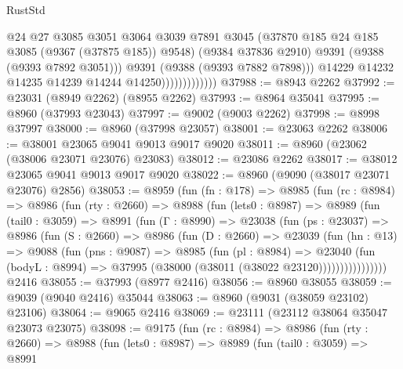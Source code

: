 \begin{lexlean}{RustStd}
\begin{coremodule}
                                  @24
                                  @27
                                  @3085
                                  @3051
                                  @3064
                                  @3039
                                  @7891
                                  @3045
                                  (@37870 @185 @24 @185 @3085 (@9367 (@37875 @185)) @9548)
                                  (@9384 @37836 @2910)
                                  @9391
                                  (@9388 (@9393 @7892 @3051)))
                                @9391
                                (@9388 (@9393 @7882 @7898)))
                              @14229
                              @14232
                              @14235
                              @14239
                              @14244
                              @14250)))))))))))))
@37988 := @8943 @2262
@37992 := @23031 (@8949 @2262) (@8955 @2262)
@37993 := @8964 @35041
@37995 := @8960 (@37993 @23043)
@37997 := @9002 (@9003 @2262)
@37998 := @8998 @37997
@38000 := @8960 (@37998 @23057)
@38001 := @23063 @2262
@38006 := @38001 @23065 @9041 @9013 @9017 @9020
@38011 := @8960 (@23062 (@38006 @23071 @23076) @23083)
@38012 := @23086 @2262
@38017 := @38012 @23065 @9041 @9013 @9017 @9020
@38022 := @8960 (@9090 (@38017 @23071 @23076) @2856)
@38053 := @8959
    (fun (fn : @178) =>
    @8985
      (fun (rc : @8984) =>
      @8986
        (fun (rty : @2660) =>
        @8988
          (fun (lets0 : @8987) =>
          @8989
            (fun (tail0 : @3059) =>
            @8991
              (fun (Γ : @8990) =>
              @23038
                (fun (ps : @23037) =>
                @8986
                  (fun (S : @2660) =>
                  @8986
                    (fun (D : @2660) =>
                    @23039
                      (fun (hn : @13) =>
                      @9088
                        (fun (pns : @9087) =>
                        @8985
                          (fun (pl : @8984) =>
                          @23040
                            (fun (bodyL : @8994) =>
                            @37995 (@38000 (@38011 (@38022 @23120))))))))))))))))
    @2416
@38055 := @37993 (@8977 @2416)
@38056 := @8960 @38055
@38059 := @9039 (@9040 @2416) @35044
@38063 := @8960 (@9031 (@38059 @23102) @23106)
@38064 := @9065 @2416
@38069 := @23111 (@23112 @38064 @35047 @23073 @23075)
@38098 := @9175
    (fun (rc : @8984) =>
    @8986
      (fun (rty : @2660) =>
      @8988
        (fun (lets0 : @8987) =>
        @8989
          (fun (tail0 : @3059) =>
          @8991

\end{coremodule}
\end{lexlean}
